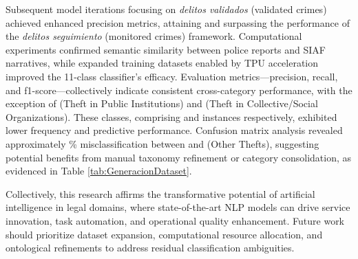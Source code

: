 \documentclass[onecolumn, journal, english, 12pt, a4paper]{IEEEtran} %
\newcommand{\modelohuggingface}{distilbert-base-multilingual-cased}
\theoremstyle{definition}
\begin{document}
Subsequent model iterations focusing on \emph{delitos validados}
(validated crimes) achieved enhanced precision metrics, attaining
 and surpassing the performance of the \emph{delitos
  seguimiento} (monitored crimes) framework. Computational experiments
confirmed semantic similarity between police reports and SIAF
narratives, while expanded training datasets enabled by TPU
acceleration improved the 11-class classifier's efficacy. Evaluation
metrics—precision, recall, and f1-score—collectively indicate
consistent cross-category performance, with the exception of  (Theft in Public Institutions) and
(Theft in Collective/Social Organizations). These classes, comprising
 and  instances respectively, exhibited
lower frequency and predictive performance. Confusion matrix analysis
revealed approximately \% misclassification between
 and  (Other
Thefts), suggesting potential benefits from manual taxonomy refinement
or category consolidation, as evidenced in Table
\ref{tab:GeneracionDataset}.

Collectively, this research affirms the transformative potential of
artificial intelligence in legal domains, where state-of-the-art NLP
models can drive service innovation, task automation, and operational
quality enhancement. Future work should prioritize dataset expansion,
computational resource allocation, and ontological refinements to
address residual classification ambiguities.


\end{document}
